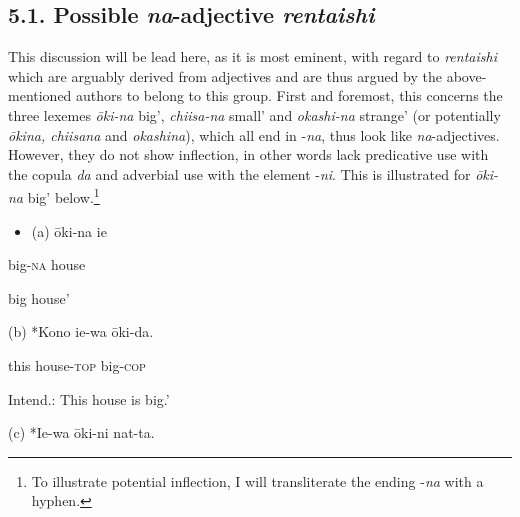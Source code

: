 \documentclass[output=paper]{langscibook}
\begin{document}
\subsection{5.1. Possible \textit{na}{}-adjective \textit{rentaishi}}

This discussion will be lead here, as it is most eminent, with regard to \textit{rentaishi} which are arguably derived from adjectives and are thus argued by the above-mentioned authors to belong to this group. First and foremost, this concerns the three lexemes \textit{ōki-na} {\textasciigrave}big’, \textit{chiisa-na} {\textasciigrave}small’ and \textit{okashi-na} {\textasciigrave}strange’ (or potentially \textit{ōkina, chiisana} and \textit{okashina}), which all end in -\textit{na}, thus look like \textit{na}{}-adjectives. However, they do not show inflection, in other words lack predicative use with the copula \textit{da} and adverbial use with the element -\textit{ni}. This is illustrated for \textit{ōki-na} {\textasciigrave}big’ below.\footnote{To illustrate potential inflection, I will transliterate the ending -\textit{na} with a hyphen.}

\begin{itemize}
\item \begin{styleBeispielCinqueKapitel}
(a) ōki-na ie
\end{styleBeispielCinqueKapitel}
\end{itemize}
\begin{styleBeispielCinqueKapitel}
big-\textsc{na} house
\end{styleBeispielCinqueKapitel}

\begin{styleBeispielCinqueKapitel}
{\textasciigrave}big house'
\end{styleBeispielCinqueKapitel}

\begin{styleBeispielCinqueKapitel}
(b) *Kono ie-wa ōki-da.
\end{styleBeispielCinqueKapitel}

\begin{styleBeispielCinqueKapitel}
this house-\textsc{top} big-\textsc{cop}
\end{styleBeispielCinqueKapitel}

\begin{styleBeispielCinqueKapitel}
Intend.: {\textasciigrave}This house is big.’
\end{styleBeispielCinqueKapitel}

\begin{styleBeispielCinqueKapitel}
(c) *Ie-wa ōki-ni nat-ta.
\end{styleBeispielCinqueKapitel}
\end{document}
